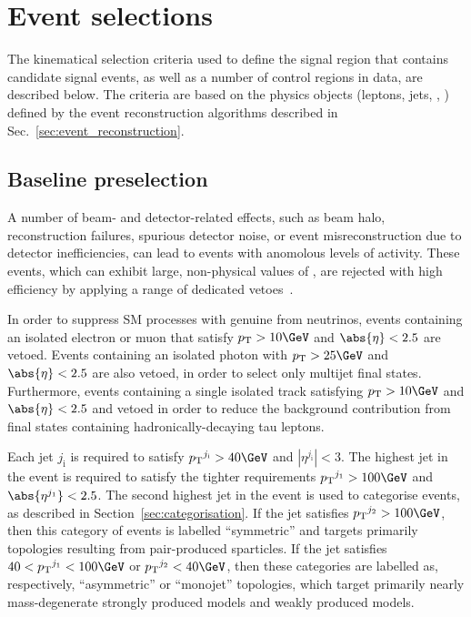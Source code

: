 \section{Event selections}
\label{sec:event_selection}


The kinematical selection criteria used to define the signal region
that contains candidate signal events, as well as a number of control
regions in data, are described below. The criteria are based on the
physics objects (leptons, jets, \ETmiss, \etc) defined by the event
reconstruction algorithms described in
Sec.~\ref{sec:event_reconstruction}.

\subsection{Baseline preselection}
\label{sec:baseline}

A number of beam- and detector-related effects, such as beam halo,
reconstruction failures, spurious detector noise, or event
misreconstruction due to detector inefficiencies, can lead to events
with anomolous levels of activity. These events, which can exhibit
large, non-physical values of \ETmiss, are rejected with high
efficiency by applying a range of dedicated
vetoes~\cite{1748-0221-5-03-T03014, CMS-NOTE-2010-012, cms-met}.

In order to suppress SM processes with genuine \ETmiss from neutrinos,
events containing an isolated electron or muon that satisfy $\Pt >
10\GeV$ and $\abs{\eta} < 2.5$ are vetoed. Events containing an
isolated photon with $\Pt > 25\GeV$ and $\abs{\eta} < 2.5$ are also
vetoed, in order to select only multijet final states. Furthermore,
events containing a single isolated track satisfying $\Pt > 10\GeV$
and $\abs{\eta} < 2.5$ and vetoed in order to reduce the background
contribution from final states containing hadronically-decaying tau
leptons.

Each jet $j_\text{i}$ is required to satisfy $\Pt^{j_\text{i}} >
40\GeV$ and $|\eta^{j_\text{i}}| < 3$. The highest \Pt jet in the
event is required to satisfy the tighter requirements
$\Pt^{j_\text{1}} > 100\GeV$ and $\abs{\eta^{j_\text{1}}} < 2.5$. The
second highest \Pt jet in the event is used to categorise events, as
described in Section~\ref{sec:categorisation}. If the jet satisfies
$\Pt^{j_\text{2}} > 100\GeV$, then this category of events is labelled
``symmetric'' and targets primarily topologies resulting from
pair-produced sparticles. If the jet satisfies $40 < \Pt^{j_\text{1}}
< 100\GeV$ or $\Pt^{j_\text{2}} < 40\GeV$, then these categories are
labelled as, respectively, ``asymmetric'' or ``monojet'' topologies,
which target primarily nearly mass-degenerate strongly produced models
and weakly produced models.

